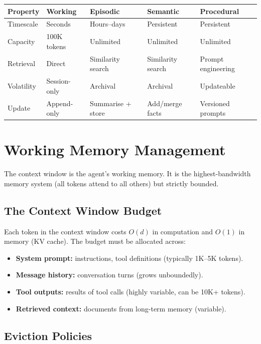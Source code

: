 \begin{longtable}{p{3cm}p{3cm}p{3cm}p{3cm}p{2.5cm}}
	\toprule
	\textbf{Property} & \textbf{Working} & \textbf{Episodic} & \textbf{Semantic} & \textbf{Procedural} \\
	\midrule
	Timescale         & Seconds          & Hours--days       & Persistent        & Persistent          \\
	Capacity          & 100K tokens      & Unlimited         & Unlimited         & Unlimited           \\
	Retrieval         & Direct           & Similarity search & Similarity search & Prompt engineering  \\
	Volatility        & Session-only     & Archival          & Archival          & Updateable          \\
	Update            & Append-only      & Summarise + store & Add/merge facts   & Versioned prompts   \\
	\bottomrule
\end{longtable}

\section{Working Memory Management}

The context window is the agent's working memory. It is the highest-bandwidth memory system (all tokens attend to all others) but strictly bounded.

\subsection{The Context Window Budget}

Each token in the context window costs $O(d)$ in computation and $O(1)$ in memory (KV cache). The budget must be allocated across:

\begin{itemize}
	\item \textbf{System prompt:} instructions, tool definitions (typically 1K--5K tokens).
	\item \textbf{Message history:} conversation turns (grows unboundedly).
	\item \textbf{Tool outputs:} results of tool calls (highly variable, can be 10K+ tokens).
	\item \textbf{Retrieved context:} documents from long-term memory (variable).
\end{itemize}

\subsection{Eviction Policies}

